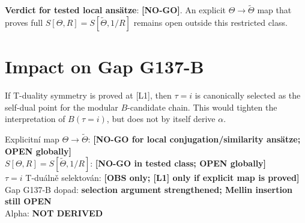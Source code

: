 \documentclass[12pt,a4paper]{article}
\begin{document}
\textbf{Verdict for tested local ans\"atze}: \textbf{[NO-GO]}.
An explicit \(\Theta\to\widetilde\Theta\) map that proves full
\(S[\Theta,R]=S[\widetilde\Theta,1/R]\) remains open outside this restricted class.

\section{Impact on Gap G137-B}
If T-duality symmetry is proved at [L1], then \(\tau=i\) is canonically selected
as the self-dual point for the modular \(B\)-candidate chain. This would tighten
the interpretation of \(B(\tau=i)\), but does not by itself derive \(\alpha\).

\begin{statusbox}
Explicitní map \(\Theta\to\widetilde\Theta\): \textbf{[NO-GO for local conjugation/similarity ans\"atze; OPEN globally]}\\
\(S[\Theta,R]=S[\widetilde\Theta,1/R]\): \textbf{[NO-GO in tested class; OPEN globally]}\\
\(\tau=i\) T-duálně selektován: \textbf{[OBS only; [L1] only if explicit map is proved]}\\
Gap G137-B dopad: \textbf{selection argument strengthened; Mellin insertion still OPEN}\\
Alpha: \textbf{NOT DERIVED}
\end{statusbox}
\end{document}
